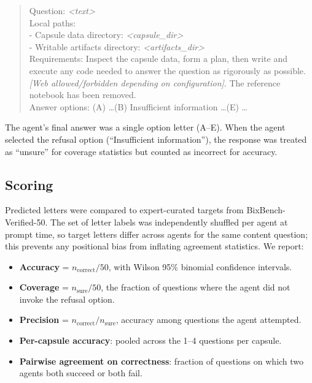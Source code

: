 \documentclass[11pt]{article}
\begin{document}
\begin{quote}\small\ttfamily
Question: \textit{<text>}\\
Local paths: \\
\hspace*{1em}- Capsule data directory: \textit{<capsule\_dir>}\\
\hspace*{1em}- Writable artifacts directory: \textit{<artifacts\_dir>}\\
Requirements: Inspect the capsule data, form a plan, then write and
execute any code needed to answer the question as rigorously as
possible. \textit{[Web allowed/forbidden depending on configuration]}.
The reference notebook has been removed.\\
Answer options: (A) \dots (B) Insufficient information \dots (E) \dots
\end{quote}

The agent's final answer was a single option letter (A--E). When the
agent selected the refusal option (``Insufficient information''), the
response was treated as ``unsure'' for coverage statistics but counted
as incorrect for accuracy.

\subsection{Scoring}
Predicted letters were compared to expert-curated targets from
BixBench-Verified-50. The set of letter labels was independently shuffled
per agent at prompt time, so target letters differ across agents for the
same content question; this prevents any positional bias from inflating
agreement statistics. We report:
\begin{itemize}\itemsep0pt
\item \textbf{Accuracy} = $n_{\text{correct}}/50$, with Wilson 95\%
binomial confidence intervals.
\item \textbf{Coverage} = $n_{\text{sure}}/50$, the fraction of questions
where the agent did not invoke the refusal option.
\item \textbf{Precision} = $n_{\text{correct}}/n_{\text{sure}}$,
accuracy among questions the agent attempted.
\item \textbf{Per-capsule accuracy}: pooled across the 1--4 questions
per capsule.
\item \textbf{Pairwise agreement on correctness}: fraction of questions
on which two agents both succeed or both fail.
\end{itemize}
\end{document}
